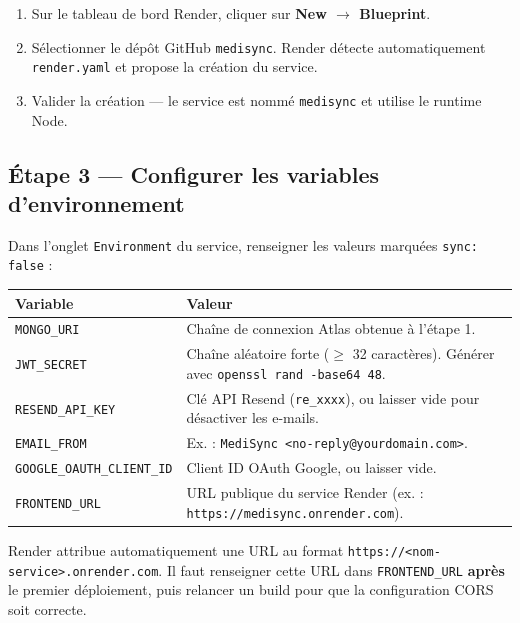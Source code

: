 \documentclass[12pt,a4paper]{report}
\begin{document}
\begin{enumerate}[leftmargin=*,itemsep=2pt]
  \item Sur le tableau de bord Render, cliquer sur \textbf{New $\rightarrow$ Blueprint}.
  \item Sélectionner le dépôt GitHub \texttt{medisync}. Render détecte automatiquement \texttt{render.yaml} et propose la création du service.
  \item Valider la création — le service est nommé \texttt{medisync} et utilise le runtime Node.
\end{enumerate}

\subsection{Étape 3 — Configurer les variables d'environnement}

Dans l'onglet \texttt{Environment} du service, renseigner les valeurs marquées \texttt{sync: false} :

\begin{center}
\small
\begin{tabularx}{\textwidth}{@{} l X @{}}
  \toprule
  \textbf{Variable} & \textbf{Valeur} \\
  \midrule
  \texttt{MONGO\_URI}              & Chaîne de connexion Atlas obtenue à l'étape 1. \\
  \texttt{JWT\_SECRET}             & Chaîne aléatoire forte ($\geq$ 32 caractères). Générer avec \texttt{openssl rand -base64 48}. \\
  \texttt{RESEND\_API\_KEY}        & Clé API Resend (\texttt{re\_xxxx}), ou laisser vide pour désactiver les e-mails. \\
  \texttt{EMAIL\_FROM}             & Ex. : \texttt{MediSync <no-reply@yourdomain.com>}. \\
  \texttt{GOOGLE\_OAUTH\_CLIENT\_ID}& Client ID OAuth Google, ou laisser vide. \\
  \texttt{FRONTEND\_URL}           & URL publique du service Render (ex. : \texttt{https://medisync.onrender.com}). \\
  \bottomrule
\end{tabularx}
\end{center}

\begin{infobox}[title=URL Render]
  Render attribue automatiquement une URL au format \texttt{https://<nom-service>.onrender.com}. Il faut renseigner cette URL dans \texttt{FRONTEND\_URL} \textbf{après} le premier déploiement, puis relancer un build pour que la configuration CORS soit correcte.
\end{infobox}
\end{document}
